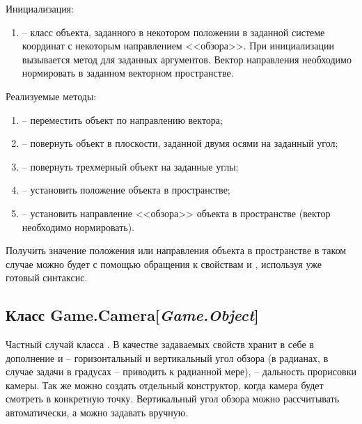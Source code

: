 	\noindent Инициализация:
	\begin{enumerate}
		\item {} -- класс объекта, заданного в некотором положении в заданной системе координат с некоторым направлением <<обзора>>. При инициализации вызывается метод  для заданных аргументов. Вектор направления необходимо нормировать в заданном векторном пространстве.
	\end{enumerate}

	\noindent Реализуемые методы:
	\begin{enumerate}
		\item {} -- переместить объект по направлению вектора;
		\item {} -- повернуть объект в плоскости, заданной двумя осями на заданный угол;
		\item {} -- повернуть трехмерный объект на заданные углы;
		\item {} -- установить положение объекта в пространстве;
		\item {} -- установить направление <<обзора>> объекта в пространстве (вектор необходимо нормировать).
	\end{enumerate}

	Получить значение положения или направления объекта в пространстве в таком случае можно будет с помощью обращения к свойствам  и , используя уже готовый синтаксис.

\subsection{Класс Game.Camera[\textit{Game.Object}]}
	\noindent Частный случай класса . В качестве задаваемых свойств хранит в себе в дополнение  и  -- горизонтальный и вертикальный угол обзора (в радианах, в случае задачи в градусах -- приводить к радианной мере),  -- дальность прорисовки камеры. Так же можно создать отдельный конструктор, когда камера будет смотреть в конкретную точку. Вертикальный угол обзора можно рассчитывать автоматически, а можно задавать вручную.

